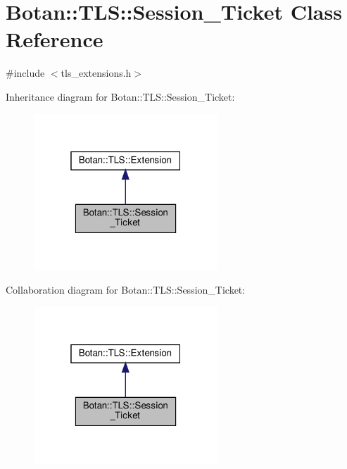\hypertarget{class_botan_1_1_t_l_s_1_1_session___ticket}{}\section{Botan\+:\+:T\+LS\+:\+:Session\+\_\+\+Ticket Class Reference}
\label{class_botan_1_1_t_l_s_1_1_session___ticket}


{\ttfamily \#include $<$tls\+\_\+extensions.\+h$>$}



Inheritance diagram for Botan\+:\+:T\+LS\+:\+:Session\+\_\+\+Ticket\+:
\nopagebreak
\begin{figure}[H]
\begin{center}
\leavevmode
\includegraphics[width=196pt]{class_botan_1_1_t_l_s_1_1_session___ticket__inherit__graph}
\end{center}
\end{figure}


Collaboration diagram for Botan\+:\+:T\+LS\+:\+:Session\+\_\+\+Ticket\+:
\nopagebreak
\begin{figure}[H]
\begin{center}
\leavevmode
\includegraphics[width=196pt]{class_botan_1_1_t_l_s_1_1_session___ticket__coll__graph}
\end{center}
\end{figure}
